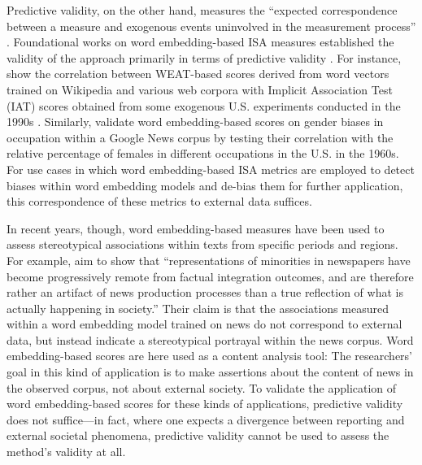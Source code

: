 Predictive validity, on the other hand, measures the ``expected correspondence between a measure and exogenous events uninvolved in the measurement process'' \parencite[][p. 222]{quinn:2010:HAP}. Foundational works on word embedding-based ISA measures established the validity of the approach primarily in terms of predictive validity \parencite[for an overview see,][]{durrheim2023}. For instance, \textcite{caliskan:2017:S} show the correlation between WEAT-based scores derived from word vectors trained on Wikipedia and various web corpora \parencite{pennington:2014:G} with Implicit Association Test (IAT) scores obtained from some exogenous U.S. experiments conducted in the 1990s \parencite{greenwald1998measuring}. Similarly, \textcite{garg:2018:W} validate word embedding-based scores on gender biases in occupation within a Google News corpus by testing their correlation with the relative percentage of females in different occupations in the U.S. in the 1960s. For use cases in which word embedding-based ISA metrics are employed to detect biases within word embedding models and de-bias them for further application, this correspondence of these metrics to external data suffices.

In recent years, though, word embedding-based measures have been used to assess stereotypical associations within texts from specific periods and regions. For example, \textcite{kroon2021} aim to show that ``representations of minorities in newspapers have become progressively remote from factual integration outcomes, and are therefore rather an artifact of news production processes than a true reflection of what is actually happening in society.'' Their claim is that the associations measured within a word embedding model trained on news do not correspond to external data, but instead indicate a stereotypical portrayal within the news corpus. Word embedding-based scores are here used as a content analysis tool: The researchers' goal in this kind of application is to make assertions about the content of news in the observed corpus, not about external society. To validate the application of word embedding-based scores for these kinds of applications, predictive validity does not suffice---in fact, where one expects a divergence between reporting and external societal phenomena, predictive validity cannot be used to assess the method's validity at all.

